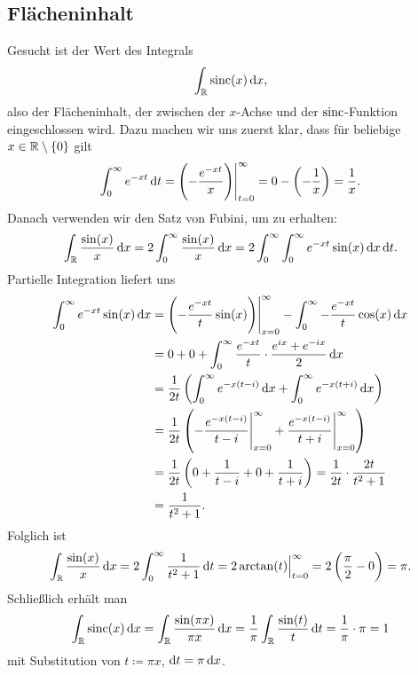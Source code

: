 \subsection{Flächeninhalt}
Gesucht ist der Wert des Integrals
\[
  \int_{\R} \sinc(x) \dif x,
\]
also der Flächeninhalt, der zwischen der $ x $-Achse und der $ \operatorname{sinc} $-Funktion eingeschlossen wird.
Dazu machen wir uns zuerst klar, dass für beliebige $ x \in \mathbb{R} \setminus \{ 0 \} $ gilt
\[
    \int_{0}^{\infty} e^{-xt} \dif t 
  = \eval{ \left( -\frac{e^{-xt}}{x} \right) }_{t = 0}^{\infty}
  = 0 - \left( -\frac{1}{x} \right) 
  = \frac{1}{x}.
\]
Danach verwenden wir den Satz von Fubini, um zu erhalten:
\[
    \int_{\R} \frac{\sin(x)}{x} \dif x
  = 2 \int_{0}^{\infty} \frac{\sin(x)}{x} \dif x
  = 2 \int_{0}^{\infty} \int_{0}^{\infty} e^{-xt} \sin(x) \dif x \dif t.
\]
Partielle Integration liefert uns
\begin{align*}
   \int_{0}^{\infty} e^{-xt} \sin(x) \dif x 
&= \eval{ \left( -\frac{e^{-xt}}{t} \sin(x) \right) }_{x = 0}^{\infty}
      - \int_{0}^{\infty} -\frac{e^{-xt}}{t} \cos(x) \dif x \\
&= 0 + 0 + \int_{0}^{\infty} \frac{e^{-xt}}{t} \cdot \frac{e^{ix} + e^{-ix}}{2} \dif x \\
&= \frac{1}{2t} \left( 
      \int_{0}^{\infty} e^{-x(t - i)} \dif x + \int_{0}^{\infty} e^{-x(t + i)} \dif x
   \right) \\
&= \frac{1}{2t} \left(
      \eval{ - \frac{e^{-x(t-i)}}{t-i} }_{x = 0}^{\infty}
      + \eval{ \frac{e^{-x(t-i)}}{t+i} }_{x = 0}^{\infty}
   \right) \\
&= \frac{1}{2t} \left( 0 + \frac{1}{t - i} + 0 + \frac{1}{t + i} \right)
 = \frac{1}{2t} \cdot \frac{2t}{t^{2} + 1} \\
&= \frac{1}{t^{2} + 1}.
\end{align*}
Folglich ist
\[
   \int_{\R} \frac{\sin(x)}{x} \dif x
= 2 \int_{0}^{\infty} \frac{1}{t^{2} + 1} \dif t
= 2 \eval[2]{\arctan(t)}_{t=0}^{\infty}
= 2 \left( \frac{\pi}{2} - 0 \right)
= \pi.
\]
Schließlich erhält man
\[
    \int_{\R} \sinc(x) \dif x
  = \int_{\R} \frac{\sin(\pi x)}{\pi x} \dif x
  = \frac{1}{\pi} \int_{\R} \frac{\sin(t)}{t} \dif t
  = \frac{1}{\pi} \cdot \pi
  = 1
\]
mit Substitution von $ t \coloneqq \pi x $, $ \dif t = \pi \dif x $.